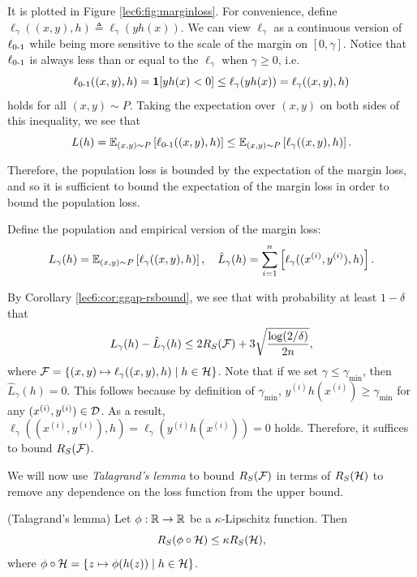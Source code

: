 It is plotted in Figure \ref{lec6:fig:marginloss}. For convenience, define $\ell_\gamma((x,y), h) \triangleq \ell_\gamma(yh(x))$. We can view $\ell_\gamma$ as a continuous version of $\ell_{\textup{0-1}}$ while being more sensitive to the scale of the margin on $[0,\gamma]$. Notice that $\ell_{\textup{0-1}}$ is always less than or equal to the $\ell_\gamma$ when $\gamma\geq 0$, i.e.
\begin{equation}
    \ell_{\textup{0-1}}((x,y), h) = \mathbf{1}[yh(x) < 0]\leq \ell_\gamma(yh(x)) =\ell_\gamma ((x,y), h)
\end{equation}
holds for all $(x,y)\sim P$. Taking the expectation over $(x,y)$ on both sides of this inequality, we see that
\begin{equation}
    L(h) = \mathbb{E}_{(x,y)\sim P} \left[ \ell_{\textup{0-1}}((x,y), h) \right] \leq \mathbb{E}_{(x,y)\sim P} \left[ \ell_\gamma ((x,y), h) \right].
\end{equation}

Therefore, the population loss is bounded by the expectation of the margin loss, and so it is sufficient to bound the expectation of the margin loss in order to bound the population loss.

Define the population and empirical version of the margin loss:
\begin{equation}
L_\gamma(h) = \mathbb{E}_{(x,y)\sim P}\left[ \ell_\gamma((x,y), h)\right], \quad \hat{L}_\gamma(h) = \sum_{i=1}^n\left [\ell_\gamma((x^{(i)},y^{(i)}), h)\right].
\end{equation}

By Corollary \ref{lec6:cor:ggap-rsbound}, we see that with probability at least $1-\delta$ that
\begin{equation}
L_\gamma(h) - \hat{L}_\gamma(h)\leq 2R_S(\mathcal F) + 3\sqrt{\frac{\log (2/\delta)}{2n}},
\end{equation}
where $\mathcal F = \{(x,y)\mapsto \ell_\gamma((x,y), h)\mid h\in\mathcal H\}$. Note that if we set $\gamma\leq \gamma_{\min}$, then $\hat{L}_{\gamma}(h) = 0$. This follows because by definition of $\gamma_{\min}$, $y^{(i)}h(x^{(i)})\geq \gamma_{\min}$ for any $(x^{(i)}, y^{(i)})\in \mathcal D$. As a result, $\ell_\gamma((x^{(i)}, y^{(i)}), h) = \ell_\gamma(y^{(i)}h(x^{(i)})) = 0$ holds. Therefore, it suffices to bound $R_S(\mathcal F)$.

We will now use \textit{Talagrand's lemma} to bound $R_S(\mathcal F)$ in terms of $R_S(\mathcal H)$ to remove any dependence on the loss function from the upper bound. 
 
\begin{lemma}{(Talagrand's lemma)}
Let $\phi:\mathbb R\to\mathbb R$ be a $\kappa$-Lipschitz function. Then \begin{equation}
    R_S(\phi\circ \mathcal H)\leq \kappa R_S(\mathcal H),
\end{equation} 
where $\phi\circ\mathcal H = \{z\mapsto \phi(h(z))\mid h\in\mathcal H\}$.
\end{lemma}

